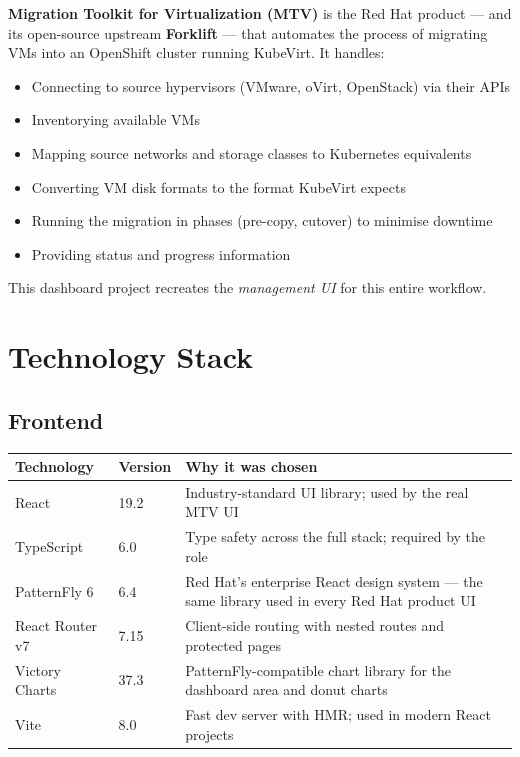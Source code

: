 \documentclass[12pt,a4paper]{article}
\begin{document}
\textbf{Migration Toolkit for Virtualization (MTV)} is the Red Hat product — and its open-source upstream \textbf{Forklift} — that automates the process of migrating VMs into an OpenShift cluster running KubeVirt. It handles:

\begin{itemize}
  \item Connecting to source hypervisors (VMware, oVirt, OpenStack) via their APIs
  \item Inventorying available VMs
  \item Mapping source networks and storage classes to Kubernetes equivalents
  \item Converting VM disk formats to the format KubeVirt expects
  \item Running the migration in phases (pre-copy, cutover) to minimise downtime
  \item Providing status and progress information
\end{itemize}

This dashboard project recreates the \emph{management UI} for this entire workflow.

\section{Technology Stack}

\subsection{Frontend}

\begin{longtable}{L{3.6cm} L{3cm} L{8cm}}
  \toprule
  \textbf{Technology} & \textbf{Version} & \textbf{Why it was chosen} \\
  \midrule
  \endhead
  React              & 19.2            & Industry-standard UI library; used by the real MTV UI \\
  TypeScript         & 6.0             & Type safety across the full stack; required by the role \\
  PatternFly 6       & 6.4             & Red Hat's enterprise React design system — the same library used in every Red Hat product UI \\
  React Router v7    & 7.15            & Client-side routing with nested routes and protected pages \\
  Victory Charts     & 37.3            & PatternFly-compatible chart library for the dashboard area and donut charts \\
  Vite               & 8.0             & Fast dev server with HMR; used in modern React projects \\
  \bottomrule
\end{longtable}
\end{document}
